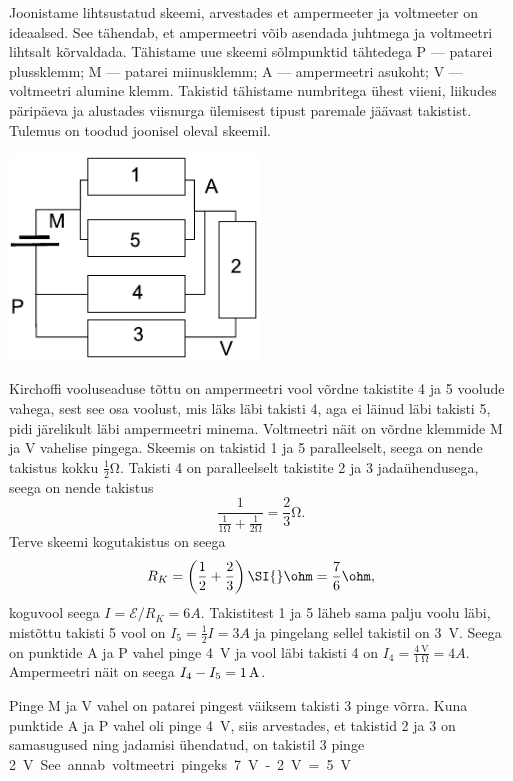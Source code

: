 \documentclass[11pt]{article}
\begin{document}
{{\ifSolution
Joonistame lihtsustatud skeemi, arvestades et ampermeeter ja voltmeeter 
on ideaalsed. See tähendab, et ampermeetri võib asendada juhtmega ja 
voltmeetri lihtsalt kõrvaldada. Tähistame uue skeemi sõlmpunktid 
tähtedega P --- patarei plussklemm; M --- patarei miinusklemm; A --- 
ampermeetri asukoht; V --- voltmeetri alumine klemm. Takistid tähistame 
numbritega ühest viieni, liikudes päripäeva ja alustades viisnurga 
ülemisest tipust paremale jäävast takistist. Tulemus on toodud joonisel 
oleval skeemil.
\begin{center}
	\includegraphics[width=0.5\textwidth]{2017-v3g-06-viisnurk-lah}
\end{center}
Kirchoffi vooluseaduse tõttu on ampermeetri vool võrdne 
takistite 4 ja 5 voolude vahega, sest see osa voolust, mis läks läbi takisti 4, aga ei läinud läbi takisti 5, pidi järelikult läbi ampermeetri minema. Voltmeetri näit on võrdne klemmide 
M ja V vahelise pingega.
Skeemis on takistid 1 ja 5 paralleelselt, seega on nende takistus kokku $\frac12 \si{\ohm}$. Takisti 4 on paralleelselt 
takistite 2 ja 3 jadaühendusega, seega on nende takistus
$$\frac{1}{\frac{1}{1\si{\ohm}}+\frac{1}{2\si{\ohm}}} = \frac 23 \si{\ohm}. $$
Terve skeemi kogutakistus on seega
\[
R_K=\left(\frac 12 + 
\frac 23\right)\SI{}\ohm=\frac 76\ohm,
\]
koguvool seega $I=\mathcal 
E/R_K=\SI{6}A$. Takistitest 1 ja 5 läheb sama palju voolu läbi,
mistõttu takisti 5 vool on $I_5=\frac 12 I=\SI{3}A$ ja pingelang sellel takistil on \SI{3}{\volt}. Seega on punktide A ja P vahel pinge \SI{4}{\volt} ja vool läbi takisti 4 
on $I_4=\frac{\SI{4}{\volt}}{\SI{1}{\ohm}}=\SI{4}A$. Ampermeetri
näit on seega $I_4-I_5=\SI 1A$.

Pinge M ja V vahel on patarei pingest väiksem takisti 3 pinge võrra. Kuna punktide A ja P vahel oli pinge \SI{4}{\volt}, siis arvestades, et takistid 2 ja 3 on samasugused ning jadamisi ühendatud, on takistil 3 pinge \SI{2}V. 
See annab voltmeetri pingeks
\SI{7}V -\SI{2}V= \SI{5}V.
\fi
}

}
\end{document}
